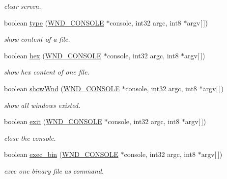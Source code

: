 \begin{DoxyCompactItemize}
\begin{DoxyCompactList}\small\item\em clear screen. \end{DoxyCompactList}\item 
boolean \hyperlink{group__commands_gac8a8a245fc6a48d6b62d373025980690}{type} (\hyperlink{struct_w_n_d___c_o_n_s_o_l_e}{W\+N\+D\+\_\+\+C\+O\+N\+S\+O\+L\+E} $\ast$console, int32 argc, int8 $\ast$argv\mbox{[}$\,$\mbox{]})
\begin{DoxyCompactList}\small\item\em show content of a file. \end{DoxyCompactList}\item 
boolean \hyperlink{group__commands_gae277888a30634f9e7c42e6b1dd89c549}{hex} (\hyperlink{struct_w_n_d___c_o_n_s_o_l_e}{W\+N\+D\+\_\+\+C\+O\+N\+S\+O\+L\+E} $\ast$console, int32 argc, int8 $\ast$argv\mbox{[}$\,$\mbox{]})
\begin{DoxyCompactList}\small\item\em show hex content of one file. \end{DoxyCompactList}\item 
boolean \hyperlink{group__commands_ga0b510371148f65ceeb6d9cde94967f78}{show\+Wnd} (\hyperlink{struct_w_n_d___c_o_n_s_o_l_e}{W\+N\+D\+\_\+\+C\+O\+N\+S\+O\+L\+E} $\ast$console, int32 argc, int8 $\ast$argv\mbox{[}$\,$\mbox{]})
\begin{DoxyCompactList}\small\item\em show all windows existed. \end{DoxyCompactList}\item 
boolean \hyperlink{group__commands_ga3376486f448be38c2a36fdb29a499675}{exit} (\hyperlink{struct_w_n_d___c_o_n_s_o_l_e}{W\+N\+D\+\_\+\+C\+O\+N\+S\+O\+L\+E} $\ast$console, int32 argc, int8 $\ast$argv\mbox{[}$\,$\mbox{]})
\begin{DoxyCompactList}\small\item\em close the console. \end{DoxyCompactList}\item 
boolean \hyperlink{group__commands_gac272c9043cab22774891e2657130d0e0}{exec\+\_\+bin} (\hyperlink{struct_w_n_d___c_o_n_s_o_l_e}{W\+N\+D\+\_\+\+C\+O\+N\+S\+O\+L\+E} $\ast$console, int32 argc, int8 $\ast$argv\mbox{[}$\,$\mbox{]})
\begin{DoxyCompactList}\small\item\em exec one binary file as command. \end{DoxyCompactList}\end{DoxyCompactItemize}


